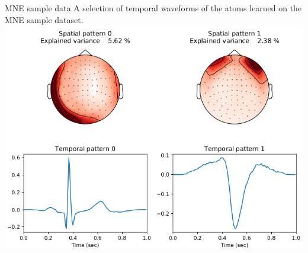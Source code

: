 \documentclass{beamer}
\begin{document}


\begin{frame}{MNE sample data}
A selection of temporal waveforms of the atoms learned on the MNE sample dataset.\\[1em]
\centering
\includegraphics[height=0.7\textheight]{artifacts}
\end{frame}


\end{document}
